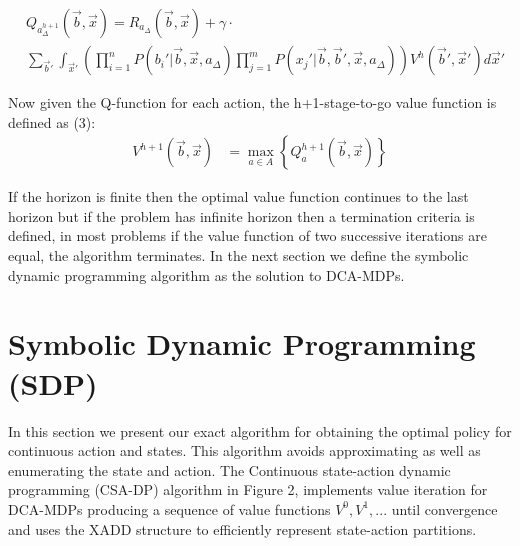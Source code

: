 \documentclass[letterpaper]{article}
\renewcommand{\-}{\text{-}}
\begin{document}
\vspace{-3mm}

{\footnotesize
\begin{align}
& Q_{a_{\Delta}^{h+1}}(\vec{b},\vec{x}) = R_{a_{\Delta}}(\vec{b},\vec{x}) + \gamma \cdot \\ 
& \sum_{\vec{b}'} \int_{\vec{x}'} \left( \prod_{i=1}^n P(b_i'|\vec{b},\vec{x},a_{\Delta}) \prod_{j=1}^m P(x_j'|\vec{b},\vec{b}',\vec{x},a_{\Delta}) \right) V^h(\vec{b}',\vec{x}') d\vec{x}' \nonumber
\end{align}
}

Now given the Q-function for each action, the h+1-stage-to-go value function is defined as (3): 
\begin{align}
V^{h+1}(\vec{b},\vec{x}) & = \max_{a \in A} \left\{ Q^{h+1}_a(\vec{b},\vec{x}) \right\} \label{eq:vfun}
\end{align}

If the horizon is finite then the optimal value function continues to the last horizon but if the problem has infinite horizon then a termination criteria is defined, in most problems if the value function of two successive iterations are equal, the algorithm terminates. In the next section we define the symbolic dynamic programming algorithm as the solution to DCA-MDPs.

\section{Symbolic Dynamic Programming (SDP)}

In this section we present our exact algorithm for obtaining the optimal policy for continuous action and states. This algorithm avoids approximating as well as enumerating the state and action. The Continuous state-action dynamic programming (CSA-DP) algorithm in Figure 2, implements value iteration for DCA-MDPs producing a sequence of value functions $V^0,V^1,...$ until convergence and uses the XADD structure to efficiently represent state-action partitions.
\end{document}
